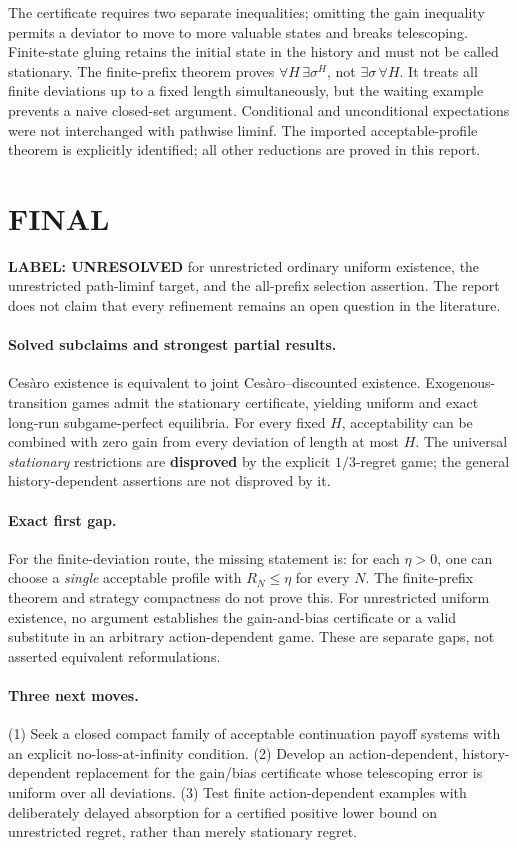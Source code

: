 \documentclass[11pt,a4paper]{article}
\theoremstyle{definition}
\theoremstyle{remark}
\begin{document}
The certificate requires two separate inequalities; omitting the gain inequality permits a deviator to move to more valuable states and breaks telescoping. Finite-state gluing retains the initial state in the history and must not be called stationary. The finite-prefix theorem proves $\forall H\,\exists\sigma^H$, not $\exists\sigma\,\forall H$. It treats all finite deviations up to a fixed length simultaneously, but the waiting example prevents a naive closed-set argument. Conditional and unconditional expectations were not interchanged with pathwise liminf. The imported acceptable-profile theorem is explicitly identified; all other reductions are proved in this report.

\section{FINAL}
\textbf{LABEL: UNRESOLVED} for unrestricted ordinary uniform existence, the unrestricted path-liminf target, and the all-prefix selection assertion. The report does not claim that every refinement remains an open question in the literature.

\paragraph{Solved subclaims and strongest partial results.}
Ces\`aro existence is equivalent to joint Ces\`aro--discounted existence. Exogenous-transition games admit the stationary certificate, yielding uniform and exact long-run subgame-perfect equilibria. For every fixed $H$, acceptability can be combined with zero gain from every deviation of length at most $H$. The universal \emph{stationary} restrictions are \textbf{disproved} by the explicit $1/3$-regret game; the general history-dependent assertions are not disproved by it.

\paragraph{Exact first gap.}
For the finite-deviation route, the missing statement is: for each $\eta>0$, one can choose a \emph{single} acceptable profile with $R_N\leq\eta$ for every $N$. The finite-prefix theorem and strategy compactness do not prove this. For unrestricted uniform existence, no argument establishes the gain-and-bias certificate or a valid substitute in an arbitrary action-dependent game. These are separate gaps, not asserted equivalent reformulations.

\paragraph{Three next moves.}
(1) Seek a closed compact family of acceptable continuation payoff systems with an explicit no-loss-at-infinity condition. (2) Develop an action-dependent, history-dependent replacement for the gain/bias certificate whose telescoping error is uniform over all deviations. (3) Test finite action-dependent examples with deliberately delayed absorption for a certified positive lower bound on unrestricted regret, rather than merely stationary regret.
\end{document}
